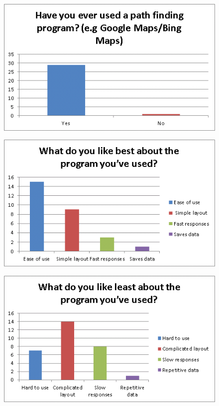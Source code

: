 \documentclass[10pt,oneside,notitlepage]{report}
\begin{document}


\begin{figure}[H]
 \centering
 \includegraphics[keepaspectratio]{1.png}
\end{figure}

\begin{figure}[H]
 \centering
 \includegraphics[keepaspectratio]{2.png}
\end{figure}

\begin{figure}[H]
 \centering
 \includegraphics[keepaspectratio]{3.png}
\end{figure}
\end{document}
